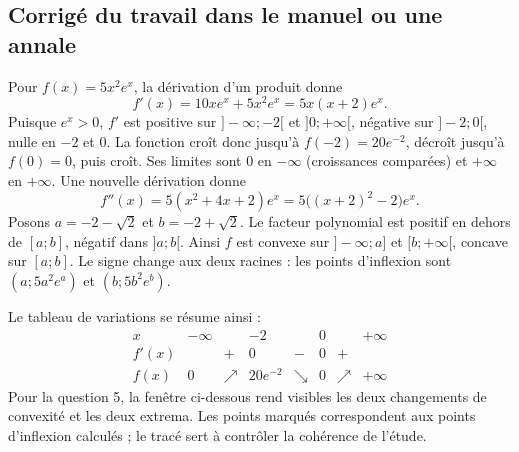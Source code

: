 \subsection{Corrigé du travail dans le manuel ou une annale}Pour $f(x)=5x^2e^x$, la dérivation d'un produit donne
\[f'(x)=10xe^x+5x^2e^x=5x(x+2)e^x.\]
Puisque $e^x>0$, $f'$ est positive sur $]-\infty;-2[$ et $]0;+\infty[$, négative sur $]-2;0[$, nulle en $-2$ et $0$. La fonction croît donc jusqu'à $f(-2)=20e^{-2}$, décroît jusqu'à $f(0)=0$, puis croît. Ses limites sont $0$ en $-\infty$ (croissances comparées) et $+\infty$ en $+\infty$.
Une nouvelle dérivation donne
\[f''(x)=5(x^2+4x+2)e^x=5\bigl((x+2)^2-2\bigr)e^x.\]
Posons $a=-2-\sqrt2$ et $b=-2+\sqrt2$. Le facteur polynomial est positif en dehors de $[a;b]$, négatif dans $]a;b[$. Ainsi $f$ est convexe sur $]-\infty;a]$ et $[b;+\infty[$, concave sur $[a;b]$. Le signe change aux deux racines : les points d'inflexion sont $(a;5a^2e^a)$ et $(b;5b^2e^b)$.\par Le tableau de variations se résume ainsi :
\[\begin{array}{c|ccccccc}x&-\infty&&-2&&0&&+\infty\\\hline f'(x)&&+&0&-&0&+&\\\hline f(x)&0&\nearrow&20e^{-2}&\searrow&0&\nearrow&+\infty\end{array}\]
Pour la question 5, la fenêtre ci-dessous rend visibles les deux changements de convexité et les deux extrema. Les points marqués correspondent aux points d'inflexion calculés ; le tracé sert à contrôler la cohérence de l'étude.
\begin{center}\end{center}

\fi

